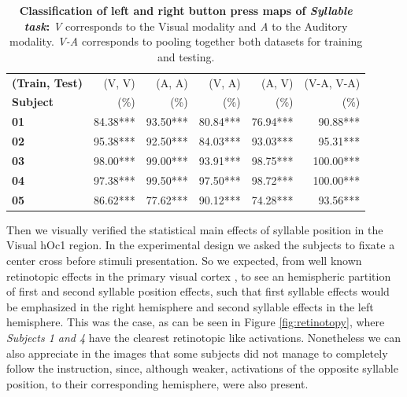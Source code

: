 \begin{table}
\begin{tabular}{|>{\bfseries}l|rrrrr|}
\toprule
(Train, Test) & (V, V) & (A, A) & (V, A) & (A, V) & (V-A, V-A) \\
Subject & (\%) &  (\%)   & (\%)  & (\%)  &   (\%)\\
\midrule
01      &   84.38*** &   93.50*** &   80.84*** &   76.94*** &           90.88*** \\
02      &   95.38*** &   92.50*** &   84.03*** &   93.03*** &           95.31*** \\
03      &   98.00*** &   99.00*** &   93.91*** &   98.75*** &          100.00*** \\
04      &   97.38*** &   99.50*** &   97.50*** &   98.72*** &          100.00*** \\
05      &   86.62*** &   77.62*** &   90.12*** &   74.28*** &           93.56*** \\
\bottomrule
\end{tabular}
\vspace{4ex}
\caption{\textbf{Classification of left and right button press maps of \emph{Syllable task}:} \emph{V} corresponds to the Visual modality and \emph{A} to the Auditory modality. \emph{V-A} corresponds to pooling together both datasets for training and testing.}
\label{table:clic}
\end{table}


Then we visually verified the statistical main effects of syllable position in the Visual hOc1 region.
In the experimental design we asked the subjects to fixate a center cross before stimuli presentation.
So we expected, from well known retinotopic effects in the primary visual cortex \citep{tootell1998retinotopy}, to see an hemispheric partition of first and second syllable position effects, such that first syllable effects would be emphasized in the right hemisphere and second syllable effects in the left hemisphere.
This was the case, as can be seen in Figure \ref{fig:retinotopy}, where \emph{Subjects 1 and 4} have the clearest retinotopic like activations.
Nonetheless we can also appreciate in the images that some subjects did not manage to completely follow the instruction, since, although weaker, activations of the opposite syllable position, to their corresponding hemisphere, were also present.


